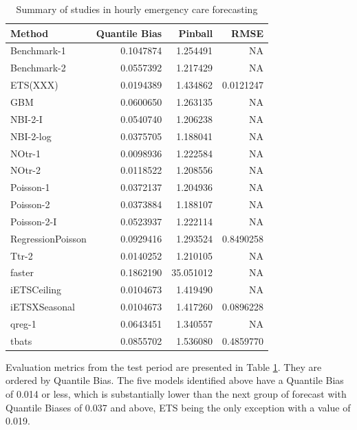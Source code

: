 \documentclass[]{elsarticle} %
\begin{document}
\begin{table}[!h]

\caption{\label{tab:tab-results}Summary of studies in hourly emergency care forecasting}
\centering
\fontsize{11}{13}\selectfont
\begin{tabular}[t]{lrrr}
\toprule
Method & Quantile Bias & Pinball & RMSE\\
\midrule
Benchmark-1 & 0.1047874 & 1.254491 & NA\\
Benchmark-2 & 0.0557392 & 1.217429 & NA\\
ETS(XXX) & 0.0194389 & 1.434862 & 0.0121247\\
GBM & 0.0600650 & 1.263135 & NA\\
NBI-2-I & 0.0540740 & 1.206238 & NA\\
NBI-2-log & 0.0375705 & 1.188041 & NA\\
NOtr-1 & 0.0098936 & 1.222584 & NA\\
NOtr-2 & 0.0118522 & 1.208556 & NA\\
Poisson-1 & 0.0372137 & 1.204936 & NA\\
Poisson-2 & 0.0373884 & 1.188107 & NA\\
Poisson-2-I & 0.0523937 & 1.222114 & NA\\
RegressionPoisson & 0.0929416 & 1.293524 & 0.8490258\\
Ttr-2 & 0.0140252 & 1.210105 & NA\\
faster & 0.1862190 & 35.051012 & NA\\
iETSCeiling & 0.0104673 & 1.419490 & NA\\
iETSXSeasonal & 0.0104673 & 1.417260 & 0.0896228\\
qreg-1 & 0.0643451 & 1.340557 & NA\\
tbats & 0.0855702 & 1.536080 & 0.4859770\\
\bottomrule
\end{tabular}
\end{table}

Evaluation metrics from the test period are presented in Table \ref{tab:tab-results}. They are ordered by Quantile Bias. The five models identified above have a Quantile Bias of 0.014 or less, which is substantially lower than the next group of forecast with Quantile Biases of 0.037 and above, ETS being the only exception with a value of 0.019.
\end{document}
